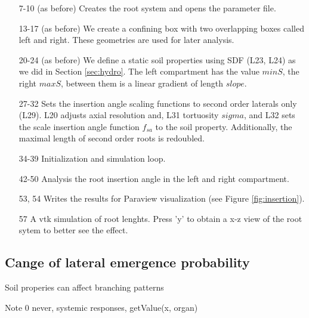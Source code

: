 \begin{itemize}

\item[7-10] (as before) Creates the root system and opens the parameter file.

\item[13-17](as before) We create a confining box with two overlapping boxes called left and right. These geometries are used for later analysis.

\item[20-24] (as before) We define a static soil properties using SDF (L23, L24) as we did in Section \ref{sec:hydro}. 
The left compartment has the value $minS$, the right $maxS$, between them is a linear gradient of length $slope$.

\item[27-32] Sets the insertion angle scaling functions to second order laterals only (L29). L20 adjusts axial resolution and, L31 tortuosity $sigma$, and L32 sets the scale insertion angle function $f_{sa}$ to the soil property. Additionally, the maximal length of second order roots is redoubled. 

\item[34-39] Initialization and simulation loop.

\item[42-50] Analysis the root insertion angle in the left and right compartment. 

\item[53, 54] Writes the results for Paraview visualization (see Figure \ref{fig:insertion}).

\item[57] A vtk simulation of root lenghts. Press 'y' to obtain a x-z view of the root sytem to better see the effect. 

\end{itemize}




\subsection{Cange of lateral emergence probability} \label{sec:branching}

Soil properies can affect branching patterns




Note 0 never, systemic responses, getValue(x, organ) 


